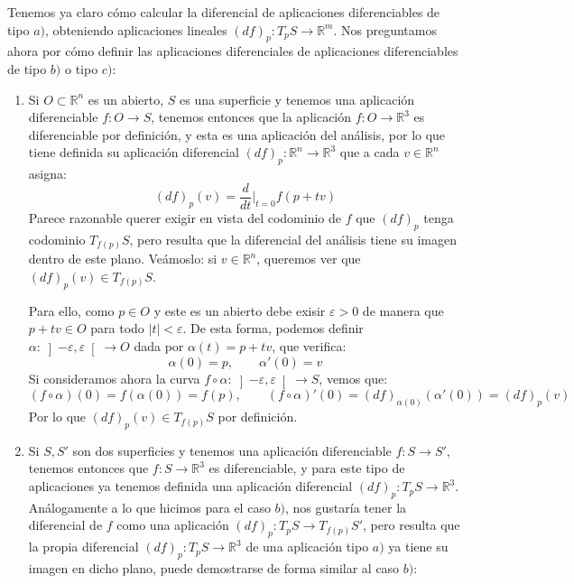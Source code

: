 \noindent
Tenemos ya claro cómo calcular la diferencial de aplicaciones diferenciables de tipo $a)$, obteniendo aplicaciones lineales $(d f)_p:T_pS\to\mathbb{R}^m$. Nos preguntamos ahora por cómo definir las aplicaciones diferenciales de aplicaciones diferenciables de tipo $b)$ o tipo $c)$:
\begin{enumerate}[label=\alph*)]
    \item[$b)$] Si $O\subset\mathbb{R}^n$ es un abierto, $S$ es una superficie y tenemos una aplicación diferenciable $f:O\to S$, tenemos entonces que la aplicación $f:O\to\mathbb{R}^3$ es diferenciable por definición, y esta es una aplicación del análisis, por lo que tiene definida su aplicación diferencial $(d f)_p:\mathbb{R}^n\to\mathbb{R}^3$ que a cada $v\in \mathbb{R}^n$ asigna:
        \begin{equation*}
            (d f)_p(v) = \frac{d}{dt}\big|_{t=0} f(p+tv)
        \end{equation*}
        Parece razonable querer exigir en vista del codominio de $f$ que $(d f)_p$ tenga codominio $T_{f(p)}S$, pero resulta que la diferencial del análisis tiene su imagen dentro de este plano. Veámoslo: si $v\in \mathbb{R}^n$, queremos ver que $(d f)_p(v)\in T_{f(p)}S$. 

        Para ello, como $p\in O$ y este es un abierto debe exisir $\varepsilon>0$ de manera que $p+tv\in O$ para todo $|t|<\varepsilon$. De esta forma, podemos definir $\alpha:\left]-\varepsilon,\varepsilon\right[\to O$ dada por $\alpha(t) = p+tv$, que verifica:
        \begin{equation*}
            \alpha(0) = p, \qquad \alpha'(0) = v
        \end{equation*}
        Si consideramos ahora la curva $f\circ \alpha:\left]-\varepsilon,\varepsilon\right[\to S$, vemos que:
        \begin{equation*}
            (f\circ \alpha)(0) = f(\alpha(0)) = f(p), \qquad (f\circ \alpha)'(0) = (d f)_{\alpha(0)}(\alpha'(0)) = (d f)_p(v)
        \end{equation*}
        Por lo que $(d f)_p(v)\in T_{f(p)}S$ por definición.
    \item[$c)$] Si $S,S'$ son dos superficies y tenemos una aplicación diferenciable $f:S\to S'$, tenemos entonces que $f:S\to \mathbb{R}^3$ es diferenciable, y para este tipo de aplicaciones ya tenemos definida una aplicación diferencial $(d f)_p:T_pS\to\mathbb{R}^3$. Análogamente a lo que hicimos para el caso $b)$, nos gustaría tener la diferencial de $f$ como una aplicación $(d f)_p:T_pS\to T_{f(p)}S'$, pero resulta que la propia diferencial $(d f)_p:T_pS\to\mathbb{R}^3$ de una aplicación tipo $a)$ ya tiene su imagen en dicho plano, puede demostrarse de forma similar al caso $b)$:


\end{enumerate}
